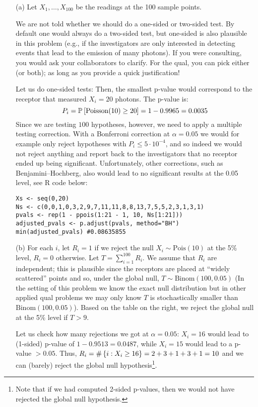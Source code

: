 \begin{enumerate}
\item[(a)] Let $X_1, \dots, X_{100}$ be the readings at the 100 sample points. 

We are not told whether we should do a one-sided or two-sided test. By default one would always do a two-sided test, but one-sided is also plausible in this problem (e.g., if the investigators are only interested in detecting events that lead to the emission of many photons). If you were consulting, you would ask your collaborators to clarify. For the qual, you can pick either (or both); as long as you provide a quick justification!

Let us do one-sided tests: Then, the smallest p-value would correspond to the receptor that measured $X_i=20$ photons. The p-value is:
$$P_i = \mathbb{P}_{}\left[\text{Poisson}(10) \geq 20\right] = 1-0.9965 = 0.0035$$
Since we are testing $100$ hypotheses, however, we need to apply a multiple testing correction. With a Bonferroni correction at $\alpha=0.05$ we would for example only reject hypotheses with $P_i \leq 5 \cdot 10^{-4}$, and so indeed we would not reject anything and report back to the investigators that no receptor ended up being significant. Unfortunately, other corrections, such as Benjamini--Hochberg, also would lead to no significant results at the 0.05 level, see R code below:

\begin{lstlisting}
Xs <- seq(0,20)
Ns <- c(0,0,1,0,3,2,9,7,11,11,8,8,13,7,5,5,2,3,1,3,1)
pvals <- rep(1 - ppois(1:21 - 1, 10, Ns[1:21]))
adjusted_pvals <- p.adjust(pvals, method="BH")
min(adjusted_pvals) #0.08635855
\end{lstlisting}



\item[(b)] For each $i$, let $R_i = 1$ if we reject the null $X_i \sim \text{Pois}(10)$ at the 5\% level, $R_i = 0$ otherwise. Let $T = \displaystyle\sum_{i=1}^{100} R_i$. We assume that $R_i$ are independent; this is plausible since the receptors are placed at ``widely scattered'' points and so, under the global null, $T \sim \text{Binom}(100, 0.05)$ (In the setting of this problem we know the exact null distribution but in other applied qual problems we may only know $T$ is stochastically smaller than $\text{Binom}(100, 0.05)$). Based on the table on the right, we reject the global null at the 5\% level if $T > 9$.

Let us check how many rejections we got at $\alpha =0.05$: $X_i = 16$ would lead to (1-sided) p-value of $1-0.9513=0.0487$, while $X_i=15$ would lead to a p-value $>0.05$. Thus, $R_i = \#\left\{i: X_i \geq 16\right\} = 2 +3 + 1 + 3+ 1 = 10$ and we can (barely) reject the global null hypothesis\footnote{Note that if we had computed 2-sided p-values, then we would not have rejected the global null hypothesis.}.


\end{enumerate}
